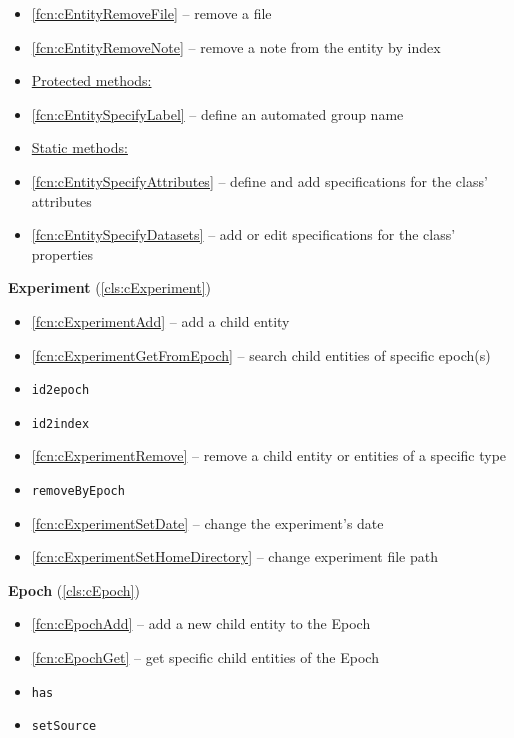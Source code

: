 \documentclass{aodatadocs}
\newcommand{\ret}[1]{\textcolor{purple5}{\texttt{#1}}}
\begin{document}
{\begin{legal}[font=\Large\bfseries, itemsep=1.5ex]
\begin{legal}[font=\large\bfseries, itemsep=1ex]
\begin{itemize}
            \item \ref{fcn:cEntityRemoveFile} -- remove a file
            \item \ref{fcn:cEntityRemoveNote} -- remove a note from the entity by index
            \item[] \hspace{-2.2ex}\underline{Protected methods:}
            \item \ref{fcn:cEntitySpecifyLabel} -- define an automated group name 
            \item[] \hspace{-2.2ex}\underline{Static methods:}
            \item \ref{fcn:cEntitySpecifyAttributes} -- define and add specifications for the class' attributes
            \item \ref{fcn:cEntitySpecifyDatasets} -- add or edit specifications for the class' properties
        \end{itemize}
        \item {\large\textbf{Experiment} (\ref{cls:cExperiment})}
        \begin{itemize}
            \item \ref{fcn:cExperimentAdd} -- add a child entity
            \item \ref{fcn:cExperimentGetFromEpoch} -- search child entities of specific epoch(s)
            \item \ret{id2epoch}
            \item \ret{id2index}
            \item \ref{fcn:cExperimentRemove} -- remove a child entity or entities of a specific type
            \item \ret{removeByEpoch}
            \item \ref{fcn:cExperimentSetDate} -- change the experiment's date
            \item \ref{fcn:cExperimentSetHomeDirectory} -- change experiment file path 
        \end{itemize}
        \item {\large\textbf{Epoch} (\ref{cls:cEpoch})}
        \begin{itemize}
            \item \ref{fcn:cEpochAdd} -- add a new child entity to the Epoch
            \item \ref{fcn:cEpochGet} -- get specific child entities of the Epoch
            \item \ret{has}
            \item \ret{setSource}

\end{itemize}
\end{legal}
\end{legal}}
\end{document}

